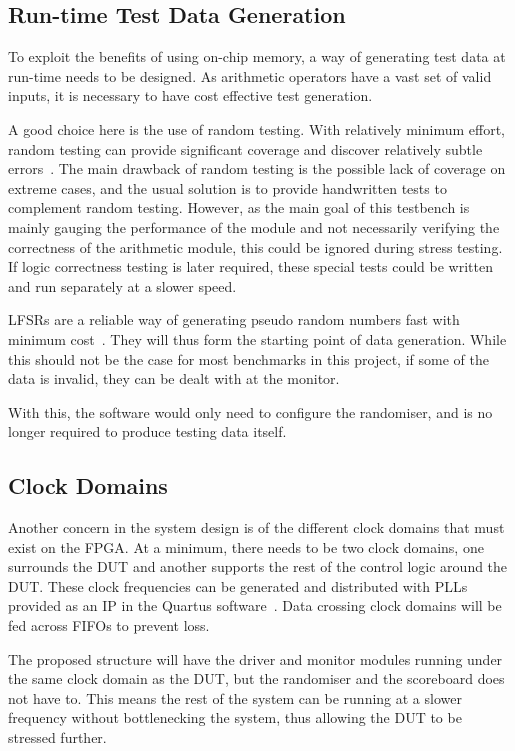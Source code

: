 \subsection{Run-time Test Data Generation}
To exploit the benefits of using on-chip memory, a way of generating test data
at run-time needs to be designed.
As arithmetic operators have a vast set of valid inputs, it is necessary to
have cost effective test generation.

A good choice here is the use of random testing.
With relatively minimum effort, random testing can provide significant coverage
and discover relatively subtle errors~\cite{Duran1}.
The main drawback of random testing is the possible lack of coverage on extreme
cases, and the usual solution is to provide handwritten tests to complement
random testing.
However, as the main goal of this testbench is mainly gauging the performance of
the module and not necessarily verifying the correctness of the arithmetic
module, this could be ignored during stress testing.
If logic correctness testing is later required, these special tests could be
written and run separately at a slower speed.

LFSRs are a reliable way of generating pseudo random numbers fast with minimum
cost~\cite{Hazwani1}.
They will thus form the starting point of data generation.
While this should not be the case for most benchmarks in this project, if some
of the data is invalid, they can be dealt with at the monitor.

With this, the software would only need to configure the randomiser, and is
no longer required to produce testing data itself.

\subsection{Clock Domains}
Another concern in the system design is of the different clock domains that
must exist on the FPGA.
At a minimum, there needs to be two clock domains, one surrounds the DUT and
another supports the rest of the control logic around the DUT.
These clock frequencies can be generated and distributed with PLLs provided as
an IP in the Quartus software~\cite{Altera4}.
Data crossing clock domains will be fed across FIFOs to prevent loss.

The proposed structure will have the driver and monitor modules running under
the same clock domain as the DUT, but the randomiser and the scoreboard does
not have to.
This means the rest of the system can be running at a slower frequency without
bottlenecking the system, thus allowing the DUT to be stressed further.

